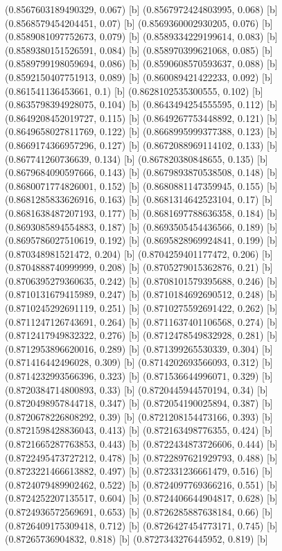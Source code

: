 {{{(0.8567603189490329, 0.067) [b] 
(0.8567972424803995, 0.068) [b] 
(0.8568579454204451, 0.07) [b] 
(0.8569360002930205, 0.076) [b] 
(0.8589081097752673, 0.079) [b] 
(0.8589334229199614, 0.083) [b] 
(0.8589380151526591, 0.084) [b] 
(0.858970399621068, 0.085) [b] 
(0.8589799198059694, 0.086) [b] 
(0.8590608570593637, 0.088) [b] 
(0.8592150407751913, 0.089) [b] 
(0.860089421422233, 0.092) [b] 
(0.861541136453661, 0.1) [b] 
(0.8628102535300555, 0.102) [b] 
(0.8635798394928075, 0.104) [b] 
(0.8643494254555595, 0.112) [b] 
(0.8649208452019727, 0.115) [b] 
(0.8649267753448892, 0.121) [b] 
(0.8649658027811769, 0.122) [b] 
(0.8668995999377388, 0.123) [b] 
(0.8669174366957296, 0.127) [b] 
(0.8672088969114102, 0.133) [b] 
(0.867741260736639, 0.134) [b] 
(0.867820380848655, 0.135) [b] 
(0.8679684090597666, 0.143) [b] 
(0.8679893870538508, 0.148) [b] 
(0.8680071774826001, 0.152) [b] 
(0.8680881147359945, 0.155) [b] 
(0.8681285833626916, 0.163) [b] 
(0.8681314642523104, 0.17) [b] 
(0.8681638487207193, 0.177) [b] 
(0.8681697788636358, 0.184) [b] 
(0.8693085894554883, 0.187) [b] 
(0.8693505454436566, 0.189) [b] 
(0.8695786027510619, 0.192) [b] 
(0.8695828969924841, 0.199) [b] 
(0.870348981521472, 0.204) [b] 
(0.8704259401177472, 0.206) [b] 
(0.8704888740999999, 0.208) [b] 
(0.8705279015362876, 0.21) [b] 
(0.8706395279360635, 0.242) [b] 
(0.8708101579395688, 0.246) [b] 
(0.8710131679415989, 0.247) [b] 
(0.8710184692690512, 0.248) [b] 
(0.8710245292691119, 0.251) [b] 
(0.8710275592691422, 0.262) [b] 
(0.8711247126743691, 0.264) [b] 
(0.8711637401106568, 0.274) [b] 
(0.8712417949832322, 0.276) [b] 
(0.8712478549832928, 0.281) [b] 
(0.8712953896620016, 0.289) [b] 
(0.871399265530339, 0.304) [b] 
(0.871416442496028, 0.309) [b] 
(0.8714202693566093, 0.312) [b] 
(0.8714232993566396, 0.323) [b] 
(0.871536644996071, 0.329) [b] 
(0.8720384714800893, 0.33) [b] 
(0.8720445944570194, 0.34) [b] 
(0.8720498957844718, 0.347) [b] 
(0.872054190025894, 0.387) [b] 
(0.8720678226808292, 0.39) [b] 
(0.8721208154473166, 0.393) [b] 
(0.8721598428836043, 0.413) [b] 
(0.872163498776355, 0.424) [b] 
(0.8721665287763853, 0.443) [b] 
(0.8722434873726606, 0.444) [b] 
(0.8722495473727212, 0.478) [b] 
(0.8722897621929793, 0.488) [b] 
(0.8723221466613882, 0.497) [b] 
(0.872331236661479, 0.516) [b] 
(0.8724079489902462, 0.522) [b] 
(0.8724097769366216, 0.551) [b] 
(0.8724252207135517, 0.604) [b] 
(0.8724406644904817, 0.628) [b] 
(0.8724936572569691, 0.653) [b] 
(0.8726285887638184, 0.66) [b] 
(0.8726409175309418, 0.712) [b] 
(0.8726427454773171, 0.745) [b] 
(0.87265736904832, 0.818) [b] 
(0.8727343276445952, 0.819) [b] 
}}}
